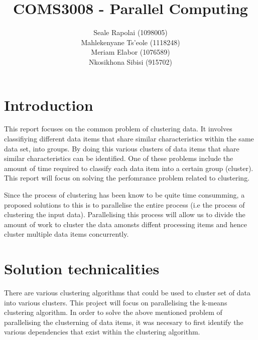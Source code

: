 \documentclass[12pt]{article}
\begin{document}
	\title{COMS3008 - Parallel Computing}
	\author{Seale Rapolai (1098005)
          \\ Mahlekenyane Ts'eole (1118248)
          \\ Meriam Elabor (1076589)
          \\ Nkosikhona Sibisi (915702)
    }
	\maketitle

	\section{Introduction}
    	\begin{flushleft}
      		This report focuses on the common problem of clustering data. It involves classifiying different data items that share similar characteristics within the same data set, into groups. By doing this various clusters of data items that share similar characteristics can be identified. One of these problems include the amount of time required to classify each data item into a certain group (cluster). This report will focus on solving the perfomrance problem related to clustering.
    	\end{flushleft}

    	\begin{flushleft}
      		Since the process of clustering has been know to be quite time consumming, a proposed solutions to this is to parallelise the entire process (i.e the process of clustering the input data). Parallelising this process will allow us to divide the amount of work to cluster the data amonsts diffent processing items and hence cluster multiple data items concurrently.
    	\end{flushleft}

	\section{Solution technicalities}
  		\begin{flushleft}
			There are various clustering algorithms that could be used to cluster set of data into various clusters. This project will focus on parallelising the k-means clustering algorithm. In order to solve the above mentioned problem of parallelising the clusterning of data items, it was necesary to first identify the various dependencies that exist within the clustering algorithm.
    	\end{flushleft}
    	
\end{document}
